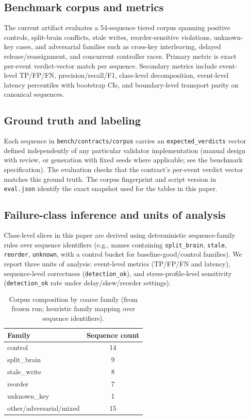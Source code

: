 \documentclass[11pt]{article}
\begin{document}
\subsection{Benchmark corpus and metrics}

The current artifact evaluates a 54-sequence tiered corpus spanning positive controls, split-brain conflicts, stale writes, reorder-sensitive violations, unknown-key cases, and adversarial families such as cross-key interleaving, delayed release/reassignment, and concurrent controller races. Primary metric is exact per-event verdict-vector match per sequence. Secondary metrics include event-level TP/FP/FN, precision/recall/F1, class-level decomposition, event-level latency percentiles with bootstrap CIs, and boundary-level transport parity on canonical sequences.

\subsection{Ground truth and labeling}
Each sequence in \texttt{bench/contracts/corpus} carries an \texttt{expected\_verdicts} vector defined independently of any particular validator implementation (manual design with review, or generation with fixed seeds where applicable; see the benchmark specification). The evaluation checks that the contract's per-event verdict vector matches this ground truth. The corpus fingerprint and script version in \texttt{eval.json} identify the exact snapshot used for the tables in this paper.

\subsection{Failure-class inference and units of analysis}
Class-level slices in this paper are derived using deterministic sequence-family rules over sequence identifiers (e.g., names containing \texttt{split\_brain}, \texttt{stale}, \texttt{reorder}, \texttt{unknown}, with a control bucket for baseline-good/control families). We report three units of analysis: event-level metrics (TP/FP/FN and latency), sequence-level correctness (\texttt{detection\_ok}), and stress-profile-level sensitivity (\texttt{detection\_ok} rate under delay/skew/reorder settings).

\begin{table}[t]
\centering
\caption{Corpus composition by coarse family (from frozen run; heuristic family mapping over sequence identifiers).}
\label{tab:composition}
\begin{tabular}{lc}
\toprule
Family & Sequence count \\
\midrule
control & 14 \\
split\_brain & 9 \\
stale\_write & 8 \\
reorder & 7 \\
unknown\_key & 1 \\
other/adversarial/mixed & 15 \\
\bottomrule
\end{tabular}
\end{table}
\end{document}
